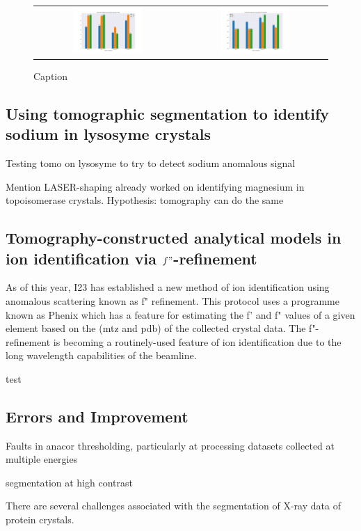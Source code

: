 \begin{figure}[h]
    \centering
    \begin{tabular}{cc}
    \includegraphics[width = 0.5\textwidth]{plots/Experiment 2 LS/ins_I_over_sigma.png} & \includegraphics[width = 0.5\textwidth]{plots/Experiment 2 LS/ins_rmerges.png}
    \end{tabular}
    \caption{Caption}
    \label{fig:insulin}
\end{figure}

\subsection{Using tomographic segmentation to identify sodium in lysosyme crystals}

Testing tomo on lysosyme to try to detect sodium anomalous signal

Mention LASER-shaping already worked on identifying magnesium in topoisomerase crystals. Hypothesis: tomography can do the same

\subsection{Tomography-constructed analytical models in ion identification via $f"$-refinement}

As of this year, I23 has established a new method of ion identification using anomalous scattering known as f" refinement. This protocol uses a programme known as Phenix which has a feature for estimating the f' and f" values of a given element based on the (mtz and pdb) of the collected crystal data. The f"-refinement is becoming a routinely-used feature of ion identification due to the long wavelength capabilities of the beamline. 

test

\subsection{Errors and Improvement}

Faults in anacor thresholding, particularly at processing datasets collected at multiple energies

segmentation at high contrast

There are several challenges associated with the segmentation of X-ray data of protein crystals.
